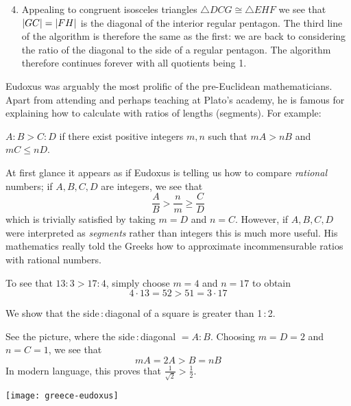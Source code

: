 	\begin{enumerate}\setcounter{enumi}{3}
	  \item Appealing to congruent isosceles triangles $\triangle DCG\cong\triangle EHF$ we see that $\left| GC\right|=\left| FH\right|$ is the diagonal of the interior regular pentagon. The third line of the algorithm is therefore the same as the first: we are back to considering the ratio of the diagonal to the side of a regular pentagon. The algorithm therefore continues forever with all quotients being 1.
	\end{enumerate}
	
	\goodbreak




	
\label{pg:eudoxus}

Eudoxus was arguably the most prolific of the pre-Euclidean mathematicians. Apart from attending and perhaps teaching at Plato's academy, he is famous for explaining how to calculate with ratios of lengths (segments). For example:

\begin{defn*}{}{}
$A:B>C:D$ if there exist positive integers $m,n$ such that $mA>nB$ and $mC\le nD$.
\end{defn*}

At first glance it appears as if Eudoxus is telling us how to compare \emph{rational} numbers; if $A,B,C,D$ are integers, we see that
\[\frac AB>\frac nm\ge \frac CD\]
which is trivially satisfied by taking $m=D$ and $n=C$.
However, if $A,B,C,D$ were interpreted as \emph{segments} rather than integers this is much more useful. His mathematics really told the Greeks how to approximate incommensurable ratios with rational numbers.

{
\exstart To see that $13:3>17:4$, simply choose $m=4$ and $n=17$ to obtain
  \[4\cdot 13=52>51=3\cdot 17\]
}
\begin{enumerate}\setcounter{enumi}{1}
  \begin{minipage}[t]{0.68\linewidth}\vspace{-10pt}
    \item We show that the side\,:\,diagonal of a square is greater than 1\,:\,2.\par
    See the picture, where the side\,:\,diagonal $=A:B$. Choosing $m=D=2$ and $n=C=1$, we see that
  \[
  mA=2A>B=nB \tag{diag $>$ side of large square}
  \]
  In modern language, this proves that $\frac 1{\sqrt 2}>\frac 12$.
  \end{minipage}\hfill
  \begin{minipage}[t]{0.31\linewidth}\vspace{-10pt}
  \flushright\texttt{[image: greece-eudoxus]}
  \end{minipage}
\end{enumerate}

